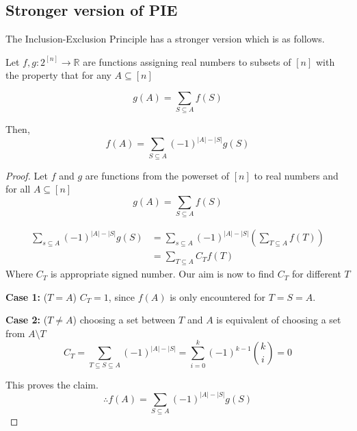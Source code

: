 \subsection{Stronger version of PIE}
The Inclusion-Exclusion Principle has a stronger version which is as follows.

\begin{theorem}
  \label{stronger PIE}
  Let $f,g:2^{[n]}\longrightarrow \mathbb{R}$ are functions assigning real numbers to subsets of $[n]$ with the property that for any $A\subseteq [n]$

  \[ g(A)=\sum_{S\subseteq A} f(S)\]

  Then,
  \[ f(A) = \sum_{S \subseteq A} (-1)^{|A|-|S|}g(S)\]

\end{theorem}


\begin{proof}
  Let $f$ and $g$ are functions from the powerset of $[n]$ to real numbers and for all $A \subseteq [n]$
  \[g(A)=\sum_{S\subseteq A}f(S)\]

  \begin{align}
    \sum _{s\subseteq A}( -1)^{|A|-|S|} g( S) & =\sum _{s\subseteq A}( -1)^{|A|-|S|}\left(\sum _{T\subseteq A} f( T)\right) \nonumber \\
                                              & =\sum _{T\subseteq A} C_{T} f( T)
  \end{align}
  Where $C_T$ is appropriate signed number. Our aim is now to find $C_T$ for different $T$

  \begin{description}
    \item{\textbf{Case 1: }($T=A$)} $C_T=1$, since $f(A)$ is only encountered for $T=S=A$.

    \item{\textbf{Case 2: }($T \neq A$)} choosing a set between $T$ and $A$ is equivalent of choosing a set from $A\setminus T$
          \[C_T=\sum _{T \subseteq S\subseteq A}( -1)^{|A|-|S|}=\sum^k_{i=0}(-1)^{k-1} {k \choose i} =0 \]
  \end{description}
  This proves the claim.
  \[\boxed{\therefore f(A) =  \sum_{S \subseteq A} (-1)^{|A|-|S|}g(S)}\]
\end{proof}

